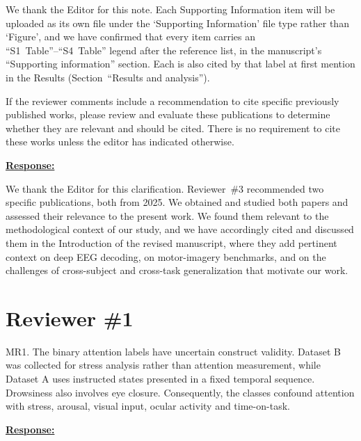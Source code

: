 \documentclass{article}
\begin{document}
We thank the Editor for this note. Each Supporting Information item will be
uploaded as its own file under the `Supporting Information' file type rather
than `Figure', and we have confirmed that every item carries an
``S1~Table''--``S4~Table'' legend after the reference list, in the
manuscript's ``Supporting information'' section. Each is also cited by that
label at first mention in the Results (Section~``Results and analysis'').

\vspace{0.3cm}


\begin{cmt}{}{}

If the reviewer comments include a recommendation to cite specific previously
published works, please review and evaluate these publications to determine
whether they are relevant and should be cited. There is no requirement to cite
these works unless the editor has indicated otherwise.

\end{cmt}
\vspace{0.1cm}
\noindent
\underline{\textbf{Response:}}
\vspace{0.2cm}

We thank the Editor for this clarification. Reviewer~\#3 recommended two
specific publications, both from 2025. We obtained and studied both papers and
assessed their relevance to the present work. We found them relevant to the
methodological context of our study, and we have accordingly cited and discussed
them in the Introduction of the revised manuscript, where they add pertinent
context on deep EEG decoding, on motor-imagery benchmarks, and on the challenges
of cross-subject and cross-task generalization that motivate our work.

\vspace{0.3cm}


\newpage
\setcounter{tcb@cnt@cmt}{0}
\section*{Reviewer \#1}

\vspace{0.4cm}

\begin{cmt}{}{}

MR1. The binary attention labels have uncertain construct validity. Dataset B
was collected for stress analysis rather than attention measurement, while
Dataset A uses instructed states presented in a fixed temporal sequence.
Drowsiness also involves eye closure. Consequently, the classes confound
attention with stress, arousal, visual input, ocular activity and time-on-task.

\end{cmt}
\vspace{0.1cm}
\noindent
\underline{\textbf{Response:}}
\vspace{0.2cm}
\end{document}
